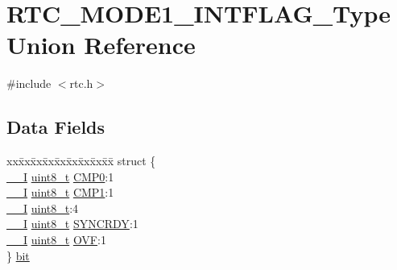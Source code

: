 \hypertarget{union_r_t_c___m_o_d_e1___i_n_t_f_l_a_g___type}{}\section{R\+T\+C\+\_\+\+M\+O\+D\+E1\+\_\+\+I\+N\+T\+F\+L\+A\+G\+\_\+\+Type Union Reference}
\label{union_r_t_c___m_o_d_e1___i_n_t_f_l_a_g___type}


{\ttfamily \#include $<$rtc.\+h$>$}

\subsection*{Data Fields}
\begin{DoxyCompactItemize}
\item 
\begin{tabbing}
xx\=xx\=xx\=xx\=xx\=xx\=xx\=xx\=xx\=\kill
struct \{\\
\>\mbox{\hyperlink{core__cm0plus_8h_af63697ed9952cc71e1225efe205f6cd3}{\_\_I}} \mbox{\hyperlink{union_r_t_c___m_o_d_e1___i_n_t_f_l_a_g___type_a5b4208c6f4c4a4290c4f2804d1eb1d5b}{uint8\_t}} \mbox{\hyperlink{union_r_t_c___m_o_d_e1___i_n_t_f_l_a_g___type_acfad8789de2381db309db911557f4563}{CMP0}}:1\\
\>\mbox{\hyperlink{core__cm0plus_8h_af63697ed9952cc71e1225efe205f6cd3}{\_\_I}} \mbox{\hyperlink{union_r_t_c___m_o_d_e1___i_n_t_f_l_a_g___type_a5b4208c6f4c4a4290c4f2804d1eb1d5b}{uint8\_t}} \mbox{\hyperlink{union_r_t_c___m_o_d_e1___i_n_t_f_l_a_g___type_a71b119fd827ff576fb34ad7581733aed}{CMP1}}:1\\
\>\mbox{\hyperlink{core__cm0plus_8h_af63697ed9952cc71e1225efe205f6cd3}{\_\_I}} \mbox{\hyperlink{union_r_t_c___m_o_d_e1___i_n_t_f_l_a_g___type_a5b4208c6f4c4a4290c4f2804d1eb1d5b}{uint8\_t}}:4\\
\>\mbox{\hyperlink{core__cm0plus_8h_af63697ed9952cc71e1225efe205f6cd3}{\_\_I}} \mbox{\hyperlink{union_r_t_c___m_o_d_e1___i_n_t_f_l_a_g___type_a5b4208c6f4c4a4290c4f2804d1eb1d5b}{uint8\_t}} \mbox{\hyperlink{union_r_t_c___m_o_d_e1___i_n_t_f_l_a_g___type_ae8a10cfa0bb63130ae1e8150943d680b}{SYNCRDY}}:1\\
\>\mbox{\hyperlink{core__cm0plus_8h_af63697ed9952cc71e1225efe205f6cd3}{\_\_I}} \mbox{\hyperlink{union_r_t_c___m_o_d_e1___i_n_t_f_l_a_g___type_a5b4208c6f4c4a4290c4f2804d1eb1d5b}{uint8\_t}} \mbox{\hyperlink{union_r_t_c___m_o_d_e1___i_n_t_f_l_a_g___type_a52c588fc013d003e33ea581b20d4ba73}{OVF}}:1\\
\} \mbox{\hyperlink{union_r_t_c___m_o_d_e1___i_n_t_f_l_a_g___type_a7bcae3a4dfab9173ff0baedd1cd93e55}{bit}}\\


\end{tabbing}
\end{DoxyCompactItemize}
